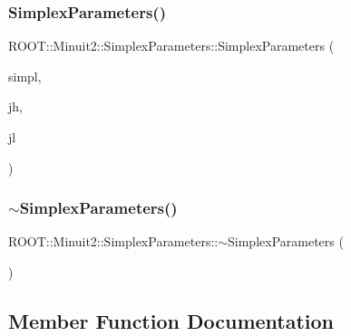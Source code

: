 \subsubsection{\texorpdfstring{SimplexParameters()}{SimplexParameters()}\hspace{0.1cm}{\footnotesize\ttfamily [3/3]}}
{\footnotesize\ttfamily R\+O\+O\+T\+::\+Minuit2\+::\+Simplex\+Parameters\+::\+Simplex\+Parameters (\begin{DoxyParamCaption}\item[{const std\+::vector$<$ std\+::pair$<$ double, \mbox{\hyperlink{namespaceROOT_1_1Minuit2_a62ed97730a1ca8d3fbaec64a19aa11c9}{Mn\+Algebraic\+Vector}} $>$ $>$ \&}]{simpl,  }\item[{unsigned int}]{jh,  }\item[{unsigned int}]{jl }\end{DoxyParamCaption})\hspace{0.3cm}{\ttfamily [inline]}}

\mbox{\label{classROOT_1_1Minuit2_1_1SimplexParameters_a13162b4c95b96890972dc24e7ba2e9a8}} 
\subsubsection{\texorpdfstring{$\sim$SimplexParameters()}{~SimplexParameters()}\hspace{0.1cm}{\footnotesize\ttfamily [3/3]}}
{\footnotesize\ttfamily R\+O\+O\+T\+::\+Minuit2\+::\+Simplex\+Parameters\+::$\sim$\+Simplex\+Parameters (\begin{DoxyParamCaption}{ }\end{DoxyParamCaption})\hspace{0.3cm}{\ttfamily [inline]}}



\subsection{Member Function Documentation}
\mbox{\label{classROOT_1_1Minuit2_1_1SimplexParameters_a40e7b3b27280a376a063a1c81904cc75}} 
